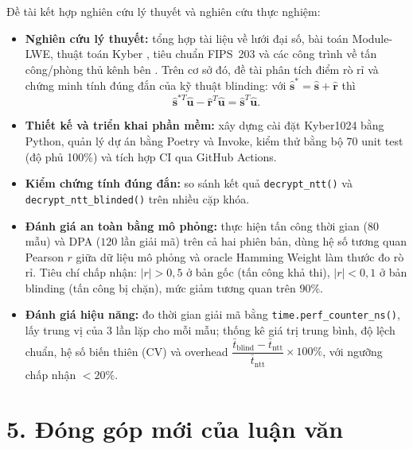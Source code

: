 \documentclass[../LuanVan.tex]{subfiles}
\begin{document}
Đề tài kết hợp nghiên cứu lý thuyết và nghiên cứu thực nghiệm:
\begin{itemize}
    \item \textbf{Nghiên cứu lý thuyết:} tổng hợp tài liệu về lưới đại số, bài toán Module-LWE, thuật toán Kyber \cite{bos2018kyber,chi2015lattice}, tiêu chuẩn FIPS~203 \cite{nist2024fips203} và các công trình về tấn công/phòng thủ kênh bên \cite{bernstein2025kyberslash,wang2023bitsliced}. Trên cơ sở đó, đề tài phân tích điểm rò rỉ và chứng minh tính đúng đắn của kỹ thuật blinding: với $\hat{\mathbf{s}}^{*}=\hat{\mathbf{s}}+\hat{\mathbf{r}}$ thì
    \[
        \hat{\mathbf{s}}^{*T}\hat{\mathbf{u}} - \hat{\mathbf{r}}^{T}\hat{\mathbf{u}} = \hat{\mathbf{s}}^{T}\hat{\mathbf{u}}.
    \]
    \item \textbf{Thiết kế và triển khai phần mềm:} xây dựng cài đặt Kyber1024 bằng Python, quản lý dự án bằng Poetry và Invoke, kiểm thử bằng bộ 70 unit test (độ phủ 100\%) và tích hợp CI qua GitHub Actions.
    \item \textbf{Kiểm chứng tính đúng đắn:} so sánh kết quả \texttt{decrypt\_ntt()} và \\ \texttt{decrypt\_ntt\_blinded()} trên nhiều cặp khóa.
    \item \textbf{Đánh giá an toàn bằng mô phỏng:} thực hiện tấn công thời gian ($80$ mẫu) và DPA ($120$ lần giải mã) trên cả hai phiên bản, dùng hệ số tương quan Pearson $r$ giữa dữ liệu mô phỏng và oracle Hamming Weight làm thước đo rò rỉ. Tiêu chí chấp nhận: $|r|>0{,}5$ ở bản gốc (tấn công khả thi), $|r|<0{,}1$ ở bản blinding (tấn công bị chặn), mức giảm tương quan trên $90\%$.
    \item \textbf{Đánh giá hiệu năng:} đo thời gian giải mã bằng \texttt{time.perf\_counter\_ns()}, lấy trung vị của 3 lần lặp cho mỗi mẫu; thống kê giá trị trung bình, độ lệch chuẩn, hệ số biến thiên (CV) và overhead $\dfrac{\bar{t}_{\text{blind}}-\bar{t}_{\text{ntt}}}{\bar{t}_{\text{ntt}}}\times 100\%$, với ngưỡng chấp nhận $<20\%$.
\end{itemize}

\section*{5. Đóng góp mới của luận văn}
\end{document}
